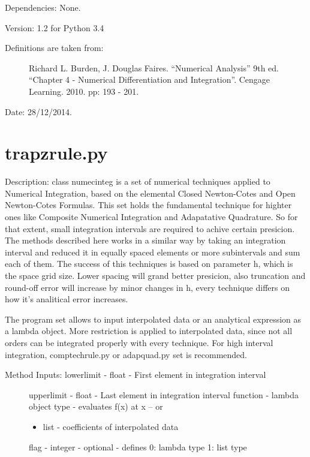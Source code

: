 \documentclass[letterpaper,10pt,oneside]{sphinxmanual}
\theoremstyle{plain}%
\theoremstyle{definition}%
\theoremstyle{remark}%
\begin{document}
Dependencies: None.

Version: 1.2 for Python 3.4
\begin{description}
\item[{Definitions are taken from:}] \leavevmode
Richard L. Burden, J. Douglas Faires. ``Numerical Analysis'' 9th ed.
``Chapter 4 - Numerical Differentiation and Integration''. 
Cengage Learning. 2010. pp: 193 - 201.

\end{description}




Date: 28/12/2014.


\section{trapzrule.py}
\label{code:trapzrule-py}\label{code:module-trapzrule}
Description: class numecinteg is a set of numerical techniques applied to
Numerical Integration, based on the elemental Closed Newton-Cotes and
Open Newton-Cotes Formulas. This set holds the fundamental technique for
highter ones like Composite Numerical Integration and Adapatative Quadrature.
So for that extent, small integration intervals are required to achive certain
presicion. The methods described here works in a similar way by taking an
integration interval and reduced it in equally spaced elements or more 
subintervals and sum each of them. The success of this techniques is based
on parameter h, which is the space grid size. Lower spacing will grand better
presicion, also truncation and round-off error will increase by minor changes
in h, every technique differs on how it's analitical error increases.

The program set allows to input interpolated data or an analytical expression
as a lambda object. More restriction is applied to interpolated data, since
not all orders can be integrated properly with every technique. For high 
interval integration, comptechrule.py or adapquad.py set is recommended.
\begin{description}
\item[{Method Inputs: lowerlimit - float - First element in integration interval}] \leavevmode
upperlimit - float - Last element in integration interval
function - lambda object type - evaluates f(x) at x -- or
\begin{itemize}
\item {} 
list - coefficients of interpolated data

\end{itemize}

flag - integer - optional - defines 0: lambda type 1: list type

\end{description}
\end{document}
